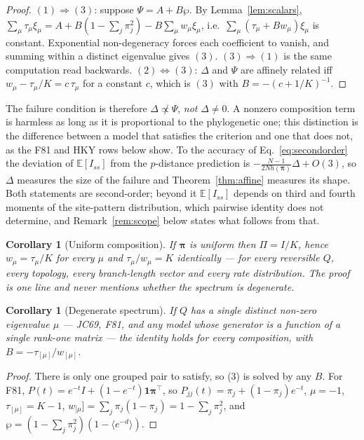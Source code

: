 \documentclass[11pt]{article}
\newcommand{\Iss}{I_{ss}}
\newcommand{\bpi}{\boldsymbol{\pi}}
\newcommand{\E}{\mathbb{E}}
\newtheorem{corollary}[theorem]{Corollary}
\theoremstyle{definition}
\theoremstyle{remark}
\begin{document}
\begin{proof}
$(1)\Rightarrow(3)$: suppose $\Psi=A+B\wp$. By Lemma~\ref{lem:scalars},
$\sum_\mu\tau_\mu\xi_\mu=A+B(1-\sum_j\pi_j^2)-B\sum_\mu w_\mu\xi_\mu$, i.e.\
$\sum_\mu(\tau_\mu+Bw_\mu)\xi_\mu$ is constant. Exponential non-degeneracy
forces each coefficient to vanish, and summing within a distinct eigenvalue
gives $(3)$. $(3)\Rightarrow(1)$ is the same computation read backwards.
$(2)\Leftrightarrow(3)$: $\Delta$ and $\Psi$ are affinely related iff
$w_\mu-\tau_\mu/K=c\,\tau_\mu$ for a constant $c$, which is $(3)$ with
$B=-(c+1/K)^{-1}$.
\end{proof}

The failure condition is therefore $\Delta\not\propto\Psi$, \emph{not}
$\Delta\ne0$. A nonzero composition term is harmless as long as it is
proportional to the phylogenetic one; this distinction is the difference
between a model that satisfies the criterion and one that does not, as the
F81 and HKY rows below show. To the accuracy of
Eq.~\eqref{eq:secondorder} the deviation of $\E[\Iss]$ from the $p$-distance
prediction is $-\frac{N-1}{2Nh(\bpi)}\Delta+O(3)$, so $\Delta$ measures the
size of the failure and Theorem~\ref{thm:affine} measures its shape. Both
statements are second-order; beyond it $\E[\Iss]$ depends on third and fourth
moments of the site-pattern distribution, which pairwise identity does not
determine, and Remark~\ref{rem:scope} below states what follows from that.

\begin{corollary}[Uniform composition]
\label{cor:uniform}
If $\bpi$ is uniform then $\Pi=I/K$, hence $w_\mu=\tau_\mu/K$ for every
$\mu$ and $\tau_\mu/w_\mu=K$ identically --- for \emph{every} reversible $Q$,
every topology, every branch-length vector and every rate distribution. The
proof is one line and never mentions whether the spectrum is degenerate.
\end{corollary}

\begin{corollary}[Degenerate spectrum]
\label{cor:degenerate}
If $Q$ has a single distinct non-zero eigenvalue $\mu$ --- JC69, F81, and any
model whose generator is a function of a single rank-one matrix --- the
identity holds for \emph{every} composition, with
$B=-\tau_{[\mu]}/w_{[\mu]}$.
\end{corollary}

\begin{proof}
There is only one grouped pair to satisfy, so (3) is solved by any $B$.
For F81, $P(t)=e^{-t}I+(1-e^{-t})\mathbf 1\bpi^{\!\top}$, so
$P_{jj}(t)=\pi_j+(1-\pi_j)e^{-t}$, $\mu=-1$, $\tau_{[\mu]}=K-1$,
$w_{[\mu}]=\sum_j\pi_j(1-\pi_j)=1-\sum_j\pi_j^2$, and
$\wp=(1-\sum_j\pi_j^2)(1-\langle e^{-d}\rangle)$.
\end{proof}
\end{document}
